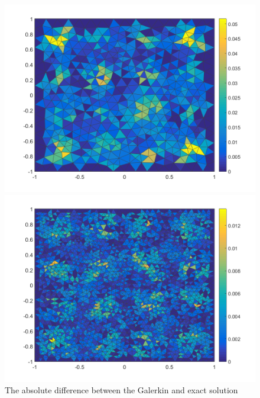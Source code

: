 \begin{figure}[!Hh]
\centering
\begin{minipage}{.5\textwidth}
  \centering
  \includegraphics[width=\linewidth]{./plots/01_1_8_err}
\end{minipage}%
\begin{minipage}{.5\textwidth}
  \centering
  \includegraphics[width=\linewidth]{./plots/01_1_16_err}
\end{minipage}
\caption{The absolute difference between the Galerkin and exact solution}
\label{fig:1_err}
\end{figure}

